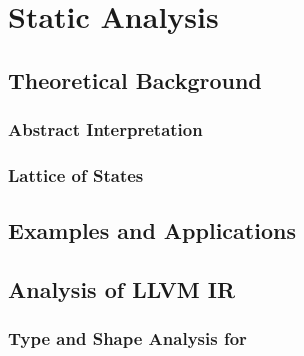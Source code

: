\chapter{Static Analysis}

\section{Theoretical Background}
\subsection{Abstract Interpretation}
\subsection{Lattice of States}

\section{Examples and Applications}

\section{Analysis of LLVM IR}
\subsection{Type and Shape Analysis for \rift}
